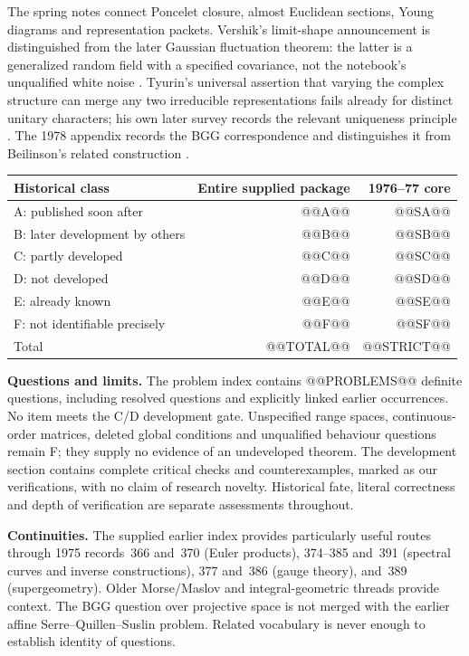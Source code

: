 The spring notes connect Poncelet closure, almost Euclidean sections,
Young diagrams and representation packets. Vershik's limit-shape
announcement is distinguished from the later Gaussian fluctuation theorem:
the latter is a generalized random field with a specified covariance,
not the notebook's unqualified white noise
\citep[\S7]{ivanovolshanski2002kerov}. Tyurin's universal assertion that
varying the complex structure can merge any two irreducible representations
fails already for distinct unitary characters; his own later survey records
the relevant uniqueness principle
\citep[Ch.~II, \S2, Exercise~10]{tyurin1978periods}. The 1978 appendix
records the BGG correspondence and distinguishes it from Beilinson's
related construction \citep{bernsteingelfandgelfand1978bundles,beilinson1978coherent}.

\begin{center}
\small
\begin{tabular}{lrr}
\hline
Historical class & Entire supplied package & 1976--77 core\\
\hline
A: published soon after & @@A@@ & @@SA@@\\
B: later development by others & @@B@@ & @@SB@@\\
C: partly developed & @@C@@ & @@SC@@\\
D: not developed & @@D@@ & @@SD@@\\
E: already known & @@E@@ & @@SE@@\\
F: not identifiable precisely & @@F@@ & @@SF@@\\
\hline
Total & @@TOTAL@@ & @@STRICT@@\\
\hline
\end{tabular}
\end{center}

\textbf{Questions and limits.} The problem index contains @@PROBLEMS@@
definite questions, including resolved questions and explicitly linked
earlier occurrences. No item meets the C/D development gate. Unspecified
range spaces, continuous-order matrices, deleted global conditions and
unqualified behaviour questions remain F; they supply no evidence of an
undeveloped theorem. The development section contains complete critical
checks and counterexamples, marked as our verifications, with no claim
of research novelty. Historical fate, literal correctness and depth of
verification are separate assessments throughout.

\textbf{Continuities.} The supplied earlier index provides particularly
useful routes through 1975 records~366 and~370 (Euler products), 374--385
and~391 (spectral curves and inverse constructions), 377 and~386 (gauge
theory), and~389 (supergeometry). Older Morse/Maslov and integral-geometric
threads provide context. The BGG question over projective space is not
merged with the earlier affine Serre--Quillen--Suslin problem. Related
vocabulary is never enough to establish identity of questions.
